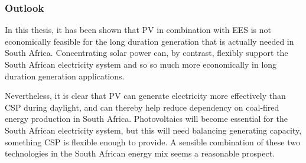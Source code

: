 \subsubsection{Outlook}

In this thesis, it has been shown that PV in combination with EES is not economically feasible for the long duration generation that is actually needed in South Africa. Concentrating solar power can, by contrast, flexibly support the South African electricity system and so so much more economically in long duration generation applications. 


Nevertheless, it is clear that PV can generate electricity more effectively than CSP during daylight, and can thereby help reduce dependency on coal-fired energy production in South Africa. Photovoltaics will become essential for the South African electricity system, but this will need balancing generating capacity, something CSP is flexible enough to provide. A sensible combination of these two technologies in the South African energy mix seems a reasonable prospect.

\clearpage
